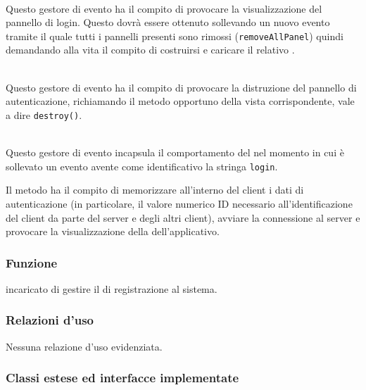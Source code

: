 \begin{description}
\item{}\\
Questo gestore di evento ha il compito di provocare la visualizzazione del pannello di login. Questo dovrà essere ottenuto sollevando un nuovo evento tramite il quale tutti i pannelli presenti sono rimossi (\verb'removeAllPanel') quindi demandando alla vita il compito di costruirsi e caricare il relativo .

\item{}\\
Questo gestore di evento ha il compito di provocare la distruzione del pannello di autenticazione, richiamando il metodo opportuno della vista corrispondente, vale a dire \verb+destroy()+.

\item{}\\
Questo gestore di evento incapsula il comportamento del  nel momento in cui è sollevato un evento avente come identificativo la stringa \verb'login'.

Il metodo ha il compito di memorizzare all'interno del client i dati di autenticazione (in particolare, il valore numerico ID necessario all'identificazione del client da parte del server e degli altri client), avviare la connessione al server e provocare la visualizzazione della  dell'applicativo.

\end{description}


\subsubsection*{Funzione}
 incaricato di gestire il  di registrazione al sistema.

\subsubsection*{Relazioni d'uso}

Nessuna relazione d'uso evidenziata.

\subsubsection*{Classi estese ed interfacce implementate}

